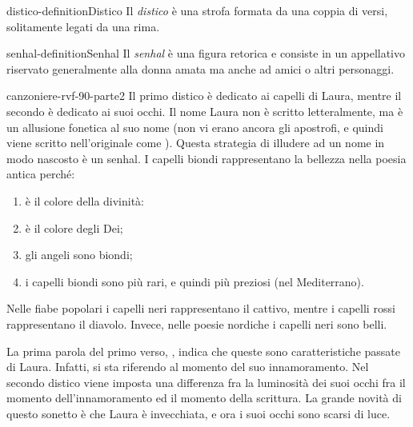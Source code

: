 \documentclass[preview]{standalone}
\begin{document}
\begin{snippetdefinition}{distico-definition}{Distico}
    Il \textit{distico} è una strofa formata da una coppia di versi, solitamente legati da una rima.
\end{snippetdefinition}

\begin{snippetdefinition}{senhal-definition}{Senhal}
    Il \textit{senhal} è una figura retorica e consiste in un
    appellativo riservato generalmente alla donna amata ma anche ad amici o
    altri personaggi.
\end{snippetdefinition}

\begin{snippet}{canzoniere-rvf-90-parte2}
     Il primo distico è dedicato ai capelli di Laura, mentre il secondo è
    dedicato ai suoi occhi. Il nome Laura non è scritto letteralmente,
    ma  è un allusione fonetica al suo nome (non vi erano ancora gli apostrofi,
    e quindi viene scritto nell'originale come ).
    Questa strategia di illudere ad un nome in modo nascosto è un senhal.
    I capelli biondi rappresentano la bellezza nella poesia antica perché:

    \begin{enumerate}
        \item è il colore della divinità:
        \item è il colore degli Dei;
        \item gli angeli sono biondi;
        \item i capelli biondi sono più rari, e quindi più preziosi (nel Mediterrano).
    \end{enumerate}
    Nelle fiabe popolari i capelli neri rappresentano il cattivo,
    mentre i capelli rossi rappresentano il diavolo.
    Invece, nelle poesie nordiche i capelli neri sono belli.

    La prima parola del primo verso, , indica che queste sono caratteristiche
    passate di Laura. Infatti, si sta riferendo al momento del suo innamoramento.
    Nel secondo distico viene imposta una differenza fra la luminosità dei suoi occhi
    fra il momento dell'innamoramento ed il momento della scrittura.
    La grande novità di questo sonetto è che Laura è invecchiata, e ora i suoi occhi sono scarsi di luce.
    \\\\


\end{snippet}
\end{document}
